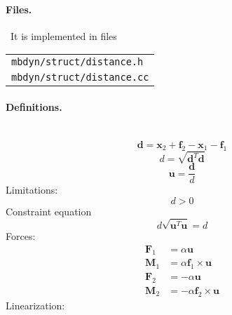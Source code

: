 \documentclass[10pt,dvips,fleqn,subeqn]{report}
\newcommand{\T}[1]{\bm{\mathbf{#1}}}
\begin{document}
\paragraph{Files.} \
It is implemented in files

\begin{tabular}{l}
\texttt{mbdyn/struct/distance.h} \\
\texttt{mbdyn/struct/distance.cc}
\end{tabular}

\paragraph{Definitions.} \
\begin{equation}
	\T{d} = \T{x}_2 + \T{f}_2 - \T{x}_1 - \T{f}_1
\end{equation}
\begin{equation}
	d = \sqrt{\T{d}^T \T{d}}
\end{equation}
\begin{equation}
	\T{u} = \frac{\T{d}}{d}
\end{equation}
Limitations:
\begin{equation}
	d > 0
\end{equation}
Constraint equation 
\begin{equation}
	d \sqrt{\T{u}^T \T{u}} = d
\end{equation}
Forces:
\begin{subequations}
\begin{align}
	\T{F}_1 &= \alpha \T{u} \\
	\T{M}_1 &= \alpha \T{f}_1 \times \T{u} \\
	\T{F}_2 &= -\alpha \T{u} \\
	\T{M}_2 &= -\alpha \T{f}_2 \times \T{u}
\end{align}
\end{subequations}
Linearization:
\end{document}
